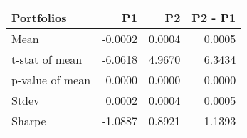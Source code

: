 \begin{tabular}{lrrr}
\toprule
Portfolios & P1 & P2 & P2 - P1 \\
\midrule
Mean & -0.0002 & 0.0004 & 0.0005 \\
t-stat of mean & -6.0618 & 4.9670 & 6.3434 \\
p-value of mean & 0.0000 & 0.0000 & 0.0000 \\
Stdev & 0.0002 & 0.0004 & 0.0005 \\
Sharpe & -1.0887 & 0.8921 & 1.1393 \\
\bottomrule
\end{tabular}
